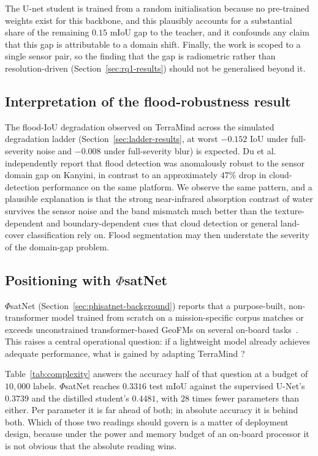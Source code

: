 The U-net student is trained from a random initialisation because no pre-trained weights exist for this backbone, and this plausibly accounts for a substantial share of the remaining $0.15$ mIoU gap to the teacher, and it confounds any claim that this gap is attributable to a domain shift.
Finally, the work is scoped to a single sensor pair, so the finding that the gap is radiometric rather than resolution-driven (Section~\ref{sec:rq1-results}) should not be generalised beyond it.

\subsection{Interpretation of the flood-robustness result}
\label{sec:discussion-comparison}

The flood-IoU degradation observed on TerraMind across the simulated degradation ladder (Section~\ref{sec:ladder-results}, at worst $-0.152$ IoU under full-severity noise and $-0.008$ under full-severity blur) is expected.
Du et al.~\cite{du2025onorbitdemonstrationgeospatialfoundation} independently report that flood detection was anomalously robust to the sensor domain gap on Kanyini, in contrast to an approximately $47\%$ drop in cloud-detection performance on the same platform.
We observe the same pattern, and a plausible explanation is that the strong near-infrared absorption contrast of water survives the sensor noise and the band mismatch much better than the texture-dependent and boundary-dependent cues that cloud detection or general land-cover classification rely on.
Flood segmentation may then understate the severity of the domain-gap problem.

\newpage

\subsection{Positioning with \texorpdfstring{$\Phi$}{Phi}satNet}
\label{sec:positioning-phisatnet}

$\Phi$satNet (Section~\ref{sec:phisatnet-background}) reports that a purpose-built, non-transformer model trained from scratch on a mission-specific corpus matches or exceeds unconstrained transformer-based GeoFMs on several on-board tasks~\cite{phisatnet}.
This raises a central operational question: if a lightweight model already achieves adequate performance, what is gained by adapting TerraMind ?

Table~\ref{tab:complexity} answers the accuracy half of that question at a budget of $10{,}000$ labels.
$\Phi$satNet reaches $0.3316$ test mIoU against the supervised U-Net's $0.3739$ and the distilled student's $0.4481$, with $28$ times fewer parameters than either.
Per parameter it is far ahead of both; in absolute accuracy it is behind both.
Which of those two readings should govern is a matter of deployment design, because under the power and memory budget of an on-board processor it is not obvious that the absolute reading wins.

